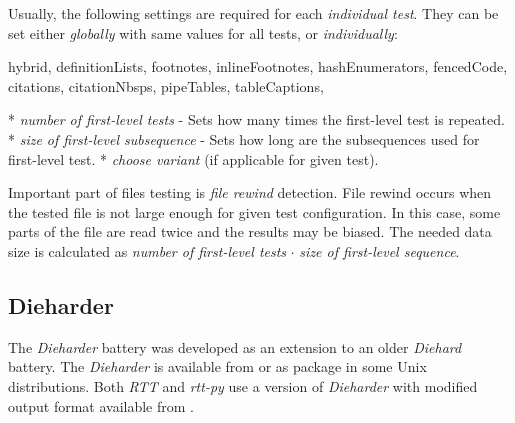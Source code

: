 \documentclass[
  digital,     %
  oneside,     %
  nosansbold,  %
  nocolorbold, %
  nolof,         %
  nolot,         %
]{fithesis4}
\begin{document}
Usually, the following settings are required for each \emph{individual test}. They can be set either \emph{globally} with same values for all tests, or \emph{individually}:
\begin{markdown*}{%
  hybrid,
  definitionLists,
  footnotes,
  inlineFootnotes,
  hashEnumerators,
  fencedCode,
  citations,
  citationNbsps,
  pipeTables,
  tableCaptions,
}

* \emph{number of first-level tests} - Sets how many times the first-level test is repeated.
* \emph{size of first-level subsequence} - Sets how long are the subsequences used for first-level test.
* \emph{choose variant} (if applicable for given test).


\end{markdown*}

Important part of files testing is \emph{file rewind} detection. File rewind occurs when the tested file is not large enough for given test configuration. In this case, some parts of the file are read twice and the results may be biased. The needed data size is calculated as \emph{number of first-level tests} $\cdot$ \emph{size of first-level sequence}.



\subsection{Dieharder} \label{chap:sols-dieharder}
The \emph{Dieharder} battery was developed as an extension to an older \emph{Diehard} battery. The \emph{Dieharder} is available from \cite{dieharder_orig} or as package in some Unix distributions. Both \emph{RTT} and \emph{rtt-py} use a version of \emph{Dieharder} with modified output format available from \cite{rtt-batteries}.
\end{document}
